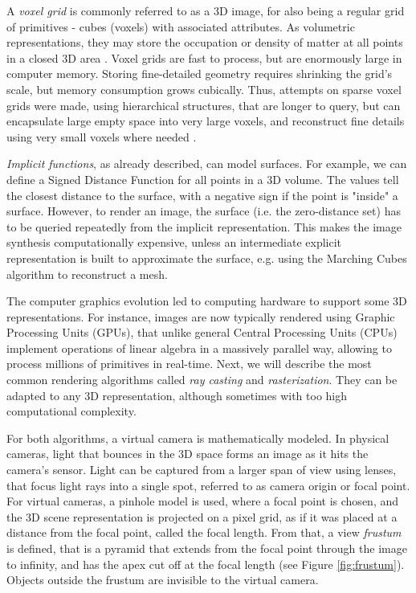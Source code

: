 A \textit{voxel grid} is commonly referred to as a 3D image, for also being a regular grid of primitives - cubes (voxels) with associated attributes. As volumetric representations, they may store the occupation or density of matter at all points in a closed 3D area \cite{aux:voxels98}. Voxel grids are fast to process, but are enormously large in computer memory. Storing fine-detailed geometry requires shrinking the grid's scale, but memory consumption grows cubically. Thus, attempts on sparse voxel grids were made, using hierarchical structures, that are longer to query, but can encapsulate large empty space into very large voxels, and reconstruct fine details using very small voxels where needed \cite{aux:voxels-sparse13}.

\textit{Implicit functions}, as already described, can model surfaces. For example, we can define a Signed Distance Function for all points in a 3D volume. The values tell the closest distance to the surface, with a negative sign if the point is "inside" a surface. However, to render an image, the surface (i.e. the zero-distance set) has to be queried repeatedly from the implicit representation. This makes the image synthesis computationally expensive, unless an intermediate explicit representation is built to approximate the surface, e.g. using the Marching Cubes algorithm \cite{aux:marching-cubes87} to reconstruct a mesh.

The computer graphics evolution led to computing hardware to support some 3D representations. For instance, images are now typically rendered using Graphic Processing Units (GPUs), that unlike general Central Processing Units (CPUs) implement operations of linear algebra in a massively parallel way, allowing to process millions of primitives in real-time. Next, we will describe the most common rendering algorithms called \textit{ray casting} and \textit{rasterization}. They can be adapted to any 3D representation, although sometimes with too high computational complexity.

For both algorithms, a virtual camera is mathematically modeled. In physical cameras, light that bounces in the 3D space forms an image as it hits the camera's sensor. Light can be captured from a larger span of view using lenses, that focus light rays into a single spot, referred to as camera origin or focal point. For virtual cameras, a pinhole model is used, where a focal point is chosen, and the 3D scene representation is projected on a pixel grid, as if it was placed at a distance from the focal point, called the focal length. From that, a view \textit{frustum} is defined, that is a pyramid that extends from the focal point through the image to infinity, and has the apex cut off at the focal length (see Figure \ref{fig:frustum}). Objects outside the frustum are invisible to the virtual camera.

